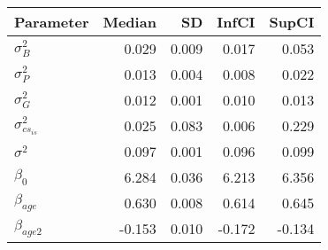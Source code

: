 \begin{table}[ht]
\centering
\begin{tabular}{lrrrr}
  \hline
Parameter & Median & SD & InfCI & SupCI \\ 
  \hline
$\sigma^{2}_{B}$ & 0.029 & 0.009 & 0.017 & 0.053 \\ 
  $\sigma^{2}_{P}$ & 0.013 & 0.004 & 0.008 & 0.022 \\ 
  $\sigma^{2}_{G}$ & 0.012 & 0.001 & 0.010 & 0.013 \\ 
  $\sigma^{2}_{cs_{is}}$ & 0.025 & 0.083 & 0.006 & 0.229 \\ 
  $\sigma^{2}$ & 0.097 & 0.001 & 0.096 & 0.099 \\ 
  $\beta_{0}$ & 6.284 & 0.036 & 6.213 & 6.356 \\ 
  $\beta_{age}$ & 0.630 & 0.008 & 0.614 & 0.645 \\ 
  $\beta_{age2}$ & -0.153 & 0.010 & -0.172 & -0.134 \\ 
   \hline
\end{tabular}
\end{table}
